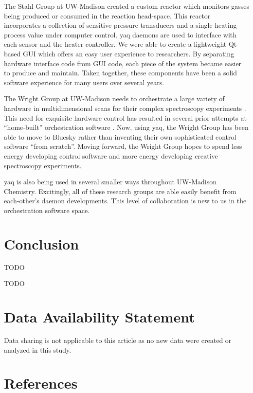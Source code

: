 \documentclass[aip, amsmath, amssymb, reprint,]{revtex4-1}
\begin{document}
The Stahl Group at UW-Madison created a custom reactor which monitors gasses being produced or consumed in the reaction head-space.  \cite{SalazarChaseA2021a}
This reactor incorporates a collection of sensitive pressure transducers and a single heating process value under computer control.
yaq daemons are used to interface with each sensor and the heater controller.
We were able to create a lightweight Qt-based GUI which offers an easy user experience to researchers.
By separating hardware interface code from GUI code, each piece of the system became easier to produce and maintain.
Taken together, these components have been a solid software experience for many users over several years.

The Wright Group at UW-Madison needs to orchestrate a large variety of hardware in multidimensional scans for their complex spectroscopy experiments \cite{MukamelShaul2000a, WrightJohnCurtis2011a}.
This need for exquisite hardware control has resulted in several prior attempts at ``home-built'' orchestration software \cite{CarlsonRogerJohn1988a, MeyerKentAlbert2004b, KainSchuyler2017a, ThompsonBlaiseJonathan2018a}.
Now, using yaq, the Wright Group has been able to move to Bluesky rather than inventing their own sophisticated control software ``from scratch''.
Moving forward, the Wright Group hopes to spend less energy developing control software and more energy developing creative spectroscopy experiments.

yaq is also being used in several smaller ways throughout UW-Madison Chemistry.
Excitingly, all of these research groups are able easily benefit from each-other's daemon developments.
This level of collaboration is new to us in the orchestration software space.

\section{Conclusion}

TODO

\begin{acknowledgments}
  TODO
\end{acknowledgments}

\section*{Data Availability Statement}

Data sharing is not applicable to this article as no new data were created or analyzed in this study.

\section*{References}

\nocite{*}

\end{document}
